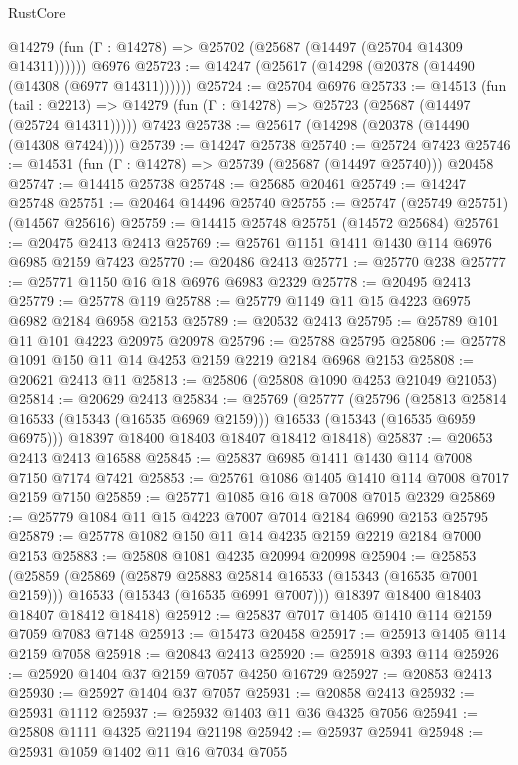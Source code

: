 \begin{lexlean}{RustCore}
\begin{coremodule}
      @14279 (fun (Γ : @14278) => @25702 (@25687 (@14497 (@25704 @14309 @14311))))))
    @6976
@25723 := @14247 (@25617 (@14298 (@20378 (@14490 (@14308 (@6977 @14311))))))
@25724 := @25704 @6976
@25733 := @14513
    (fun (tail : @2213) => @14279 (fun (Γ : @14278) => @25723 (@25687 (@14497 (@25724 @14311)))))
    @7423
@25738 := @25617 (@14298 (@20378 (@14490 (@14308 @7424))))
@25739 := @14247 @25738
@25740 := @25724 @7423
@25746 := @14531 (fun (Γ : @14278) => @25739 (@25687 (@14497 @25740))) @20458
@25747 := @14415 @25738
@25748 := @25685 @20461
@25749 := @14247 @25748
@25751 := @20464 @14496 @25740
@25755 := @25747 (@25749 @25751) (@14567 @25616)
@25759 := @14415 @25748 @25751 (@14572 @25684)
@25761 := @20475 @2413 @2413
@25769 := @25761 @1151 @1411 @1430 @114 @6976 @6985 @2159 @7423
@25770 := @20486 @2413
@25771 := @25770 @238
@25777 := @25771 @1150 @16 @18 @6976 @6983 @2329
@25778 := @20495 @2413
@25779 := @25778 @119
@25788 := @25779 @1149 @11 @15 @4223 @6975 @6982 @2184 @6958 @2153
@25789 := @20532 @2413
@25795 := @25789 @101 @11 @101 @4223 @20975 @20978
@25796 := @25788 @25795
@25806 := @25778 @1091 @150 @11 @14 @4253 @2159 @2219 @2184 @6968 @2153
@25808 := @20621 @2413 @11
@25813 := @25806 (@25808 @1090 @4253 @21049 @21053)
@25814 := @20629 @2413
@25834 := @25769
    (@25777
      (@25796
        (@25813 @25814 @16533 (@15343 (@16535 @6969 @2159)))
        @16533
        (@15343 (@16535 @6959 @6975)))
      @18397
      @18400
      @18403
      @18407
      @18412
      @18418)
@25837 := @20653 @2413 @2413 @16588
@25845 := @25837 @6985 @1411 @1430 @114 @7008 @7150 @7174 @7421
@25853 := @25761 @1086 @1405 @1410 @114 @7008 @7017 @2159 @7150
@25859 := @25771 @1085 @16 @18 @7008 @7015 @2329
@25869 := @25779 @1084 @11 @15 @4223 @7007 @7014 @2184 @6990 @2153 @25795
@25879 := @25778 @1082 @150 @11 @14 @4235 @2159 @2219 @2184 @7000 @2153
@25883 := @25808 @1081 @4235 @20994 @20998
@25904 := @25853
    (@25859
      (@25869
        (@25879 @25883 @25814 @16533 (@15343 (@16535 @7001 @2159)))
        @16533
        (@15343 (@16535 @6991 @7007)))
      @18397
      @18400
      @18403
      @18407
      @18412
      @18418)
@25912 := @25837 @7017 @1405 @1410 @114 @2159 @7059 @7083 @7148
@25913 := @15473 @20458
@25917 := @25913 @1405 @114 @2159 @7058
@25918 := @20843 @2413
@25920 := @25918 @393 @114
@25926 := @25920 @1404 @37 @2159 @7057 @4250 @16729
@25927 := @20853 @2413
@25930 := @25927 @1404 @37 @7057
@25931 := @20858 @2413
@25932 := @25931 @1112
@25937 := @25932 @1403 @11 @36 @4325 @7056
@25941 := @25808 @1111 @4325 @21194 @21198
@25942 := @25937 @25941
@25948 := @25931 @1059 @1402 @11 @16 @7034 @7055

\end{coremodule}
\end{lexlean}
